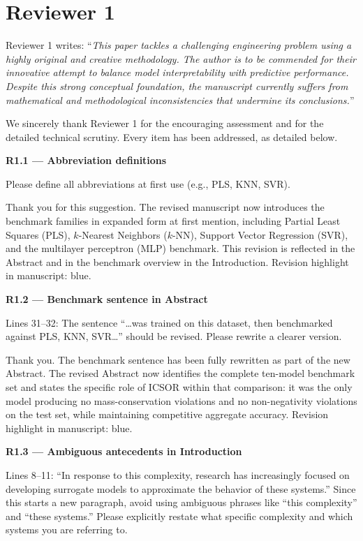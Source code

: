 \documentclass[a4paper,11pt]{article}
\newcommand{\reviewlabel}[1]{\noindent\textbf{\textcolor{accentblue}{#1}}\par\medskip}
\newcommand{\revhighlight}[2]{\textcolor{#1}{Revision highlight in manuscript: #2.}}
\begin{document}
\section*{Reviewer 1}

Reviewer 1 writes: ``\textit{This paper tackles a challenging engineering problem using a highly original and creative methodology. The author is to be commended for their innovative attempt to balance model interpretability with predictive performance. Despite this strong conceptual foundation, the manuscript currently suffers from mathematical and methodological inconsistencies that undermine its conclusions.}''

We sincerely thank Reviewer 1 for the encouraging assessment and for the detailed technical scrutiny. Every item has been addressed, as detailed below.

\reviewlabel{R1.1 --- Abbreviation definitions}
\begin{reviewbox}
Please define all abbreviations at first use (e.g., PLS, KNN, SVR).
\end{reviewbox}

Thank you for this suggestion. The revised manuscript now introduces the benchmark families in expanded form at first mention, including Partial Least Squares (PLS), $k$-Nearest Neighbors ($k$-NN), Support Vector Regression (SVR), and the multilayer perceptron (MLP) benchmark. This revision is reflected in the Abstract and in the benchmark overview in the Introduction. \revhighlight{revDefault}{blue}

\reviewlabel{R1.2 --- Benchmark sentence in Abstract}
\begin{reviewbox}
Lines 31--32: The sentence ``\ldots was trained on this dataset, then benchmarked against PLS, KNN, SVR\ldots'' should be revised. Please rewrite a clearer version.
\end{reviewbox}

Thank you. The benchmark sentence has been fully rewritten as part of the new Abstract. The revised Abstract now identifies the complete ten-model benchmark set and states the specific role of ICSOR within that comparison: it was the only model producing no mass-conservation violations and no non-negativity violations on the test set, while maintaining competitive aggregate accuracy. \revhighlight{revDefault}{blue}

\reviewlabel{R1.3 --- Ambiguous antecedents in Introduction}
\begin{reviewbox}
Lines 8--11: ``In response to this complexity, research has increasingly focused on developing surrogate models to approximate the behavior of these systems.'' Since this starts a new paragraph, avoid using ambiguous phrases like ``this complexity'' and ``these systems.'' Please explicitly restate what specific complexity and which systems you are referring to.
\end{reviewbox}
\end{document}
